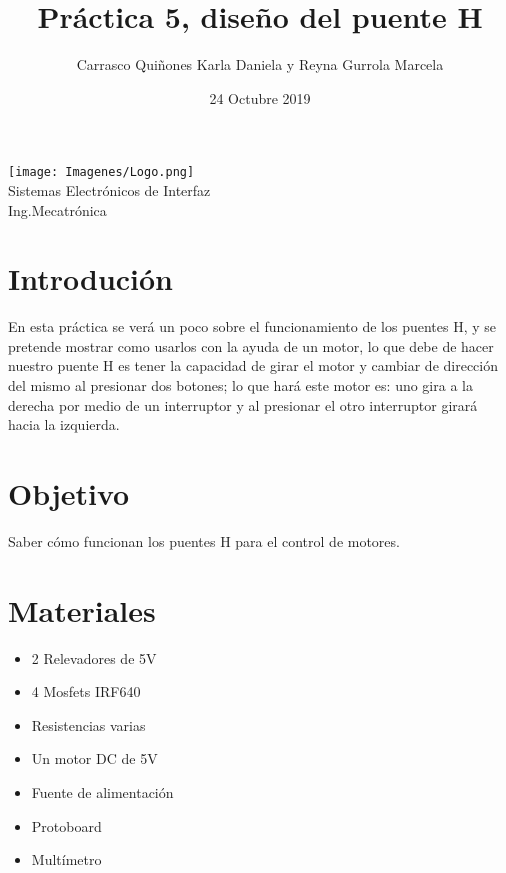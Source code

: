 \documentclass[letterpaper]{article}
\title{Práctica 5, diseño del puente H}
\author{Carrasco Quiñones Karla Daniela y Reyna Gurrola Marcela}
\date{24 Octubre 2019}
\begin{document}
\maketitle
\begin{center}
    \texttt{[image: Imagenes/Logo.png]}\\
    \vspace{1cm}
Sistemas Electrónicos de Interfaz\\
Ing.Mecatrónica
\end{center}\newpage


\section{Introdución}

 \begin{large}
En esta práctica se verá un poco sobre el funcionamiento de los puentes H, y se pretende mostrar como usarlos con la ayuda de un motor, lo que debe de hacer nuestro puente H es tener la capacidad de girar el motor y cambiar de dirección  del mismo al presionar dos botones; lo que hará este motor es: uno gira a la derecha por medio de un interruptor y al presionar el otro interruptor girará hacia la izquierda.
\end{large}




\section{Objetivo}
Saber cómo funcionan los puentes H para el control de motores.


\section{Materiales}
\begin{itemize}
    \item 2 Relevadores de 5V
    \item 4 Mosfets IRF640
    \item Resistencias varias
    \item Un motor DC de 5V
    \item Fuente de alimentación
    \item Protoboard
    \item Multímetro
\end{itemize}
\end{document}
